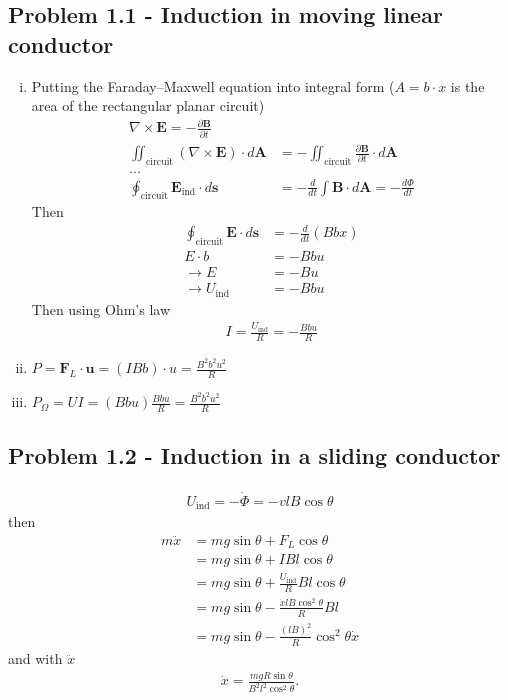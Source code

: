 \documentclass[../main.tex]{subfiles}
\begin{document}
\subsection{Problem 1.1 - Induction in moving linear conductor}
\begin{enumerate}[(i)]
\item Putting the Faraday–Maxwell equation into integral form ($A=b\cdot x$  is the area of the rectangular planar circuit)
\begin{align}
\nabla\times\mathbf{E}=-\frac{\partial\mathbf{B}}{\partial t}\\
\iint_\text{circuit}(\nabla\times\mathbf{E})\cdot d\mathbf{A}&=-\iint_\text{circuit}\frac{\partial\mathbf{B}}{\partial t}\cdot d\mathbf{A}\\
...\\
\oint_\text{circuit}\mathbf{E}_\text{ind}\cdot d\mathbf{s}&=-\frac{d}{dt}\int\mathbf{B}\cdot d\mathbf{A}=-\frac{d\Phi}{dt}
\end{align}
Then
\begin{align}
\oint_\text{circuit}\mathbf{E}\cdot d\mathbf{s}&=- \frac{d}{dt}(Bbx)\\
E\cdot b&= -Bbu\\
\rightarrow E&=-Bu\\
\rightarrow U_\text{ind}&=-Bbu
\end{align}
Then using Ohm's law
\begin{align}
I=\frac{U_\text{ind}}{R}=-\frac{Bbu}{R}
\end{align}

\item $P=\mathbf{F}_L\cdot\mathbf{u}=(IBb)\cdot u=\frac{B^2b^2u^2}{R}$
\item $P_\Omega=UI=(Bbu)\frac{Bbu}{R}=\frac{B^2b^2u^2}{R}$
\end{enumerate}

\subsection{Problem 1.2 - Induction in a sliding conductor}
\begin{align}
U_\text{ind}=-\dot\Phi=-vlB\cos\theta
\end{align}
then
\begin{align}
m\ddot{x}
&=mg\sin\theta+F_L\cos\theta\\
&=mg\sin\theta+IBl\cos\theta\\
&=mg\sin\theta+\frac{U_\text{ind}}{R}Bl\cos\theta\\
&=mg\sin\theta-\frac{\dot{x}lB\cos^2\theta}{R}Bl\\
&=mg\sin\theta-\frac{(lB)^2}{R}\cos^2\theta\dot{x}
\end{align}
and with $\ddot{x}$
\begin{align}
\dot{x}=\frac{mgR\sin\theta}{B^2l^2\cos^2\theta}.
\end{align}
\end{document}
